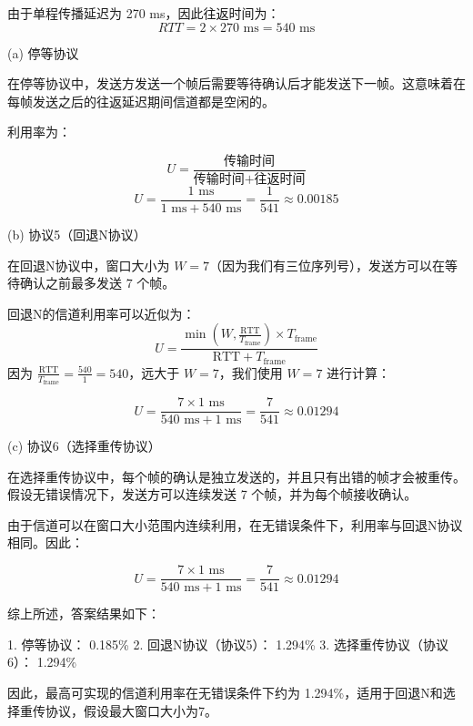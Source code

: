 由于单程传播延迟为 270 ms，因此往返时间为：
   \[
   RTT = 2 \times 270 \text{ ms} = 540 \text{ ms}
   \]

(a) 停等协议

在停等协议中，发送方发送一个帧后需要等待确认后才能发送下一帧。这意味着在每帧发送之后的往返延迟期间信道都是空闲的。

利用率为：

\[
U = \frac{\text{传输时间}}{\text{传输时间} + \text{往返时间}}
\]
\[
U = \frac{1 \text{ ms}}{1 \text{ ms} + 540 \text{ ms}} = \frac{1}{541} \approx 0.00185
\]

(b) 协议5（回退N协议）

在回退N协议中，窗口大小为 $W=7$（因为我们有三位序列号），发送方可以在等待确认之前最多发送 7 个帧。

回退N的信道利用率可以近似为：
\[
U = \frac{\min(W, \frac{\text{RTT}}{T_{\text{frame}}}) \times T_{\text{frame}}}{\text{RTT} + T_{\text{frame}}}
\]
因为 $ \frac{\text{RTT}}{T_{\text{frame}}} = \frac{540}{1} = 540 $，远大于 $ W = 7 $，我们使用 $ W = 7 $ 进行计算：

\[
U = \frac{7 \times 1 \text{ ms}}{540 \text{ ms} + 1 \text{ ms}} = \frac{7}{541} \approx 0.01294
\]

(c) 协议6（选择重传协议）

在选择重传协议中，每个帧的确认是独立发送的，并且只有出错的帧才会被重传。假设无错误情况下，发送方可以连续发送 7 个帧，并为每个帧接收确认。

由于信道可以在窗口大小范围内连续利用，在无错误条件下，利用率与回退N协议相同。因此：

\[
U = \frac{7 \times 1 \text{ ms}}{540 \text{ ms} + 1 \text{ ms}} = \frac{7}{541} \approx 0.01294
\]

综上所述，答案结果如下：

1. 停等协议： 0.185\%
2. 回退N协议（协议5）： 1.294\%
3. 选择重传协议（协议6）： 1.294\%

因此，最高可实现的信道利用率在无错误条件下约为 1.294\%，适用于回退N和选择重传协议，假设最大窗口大小为7。



